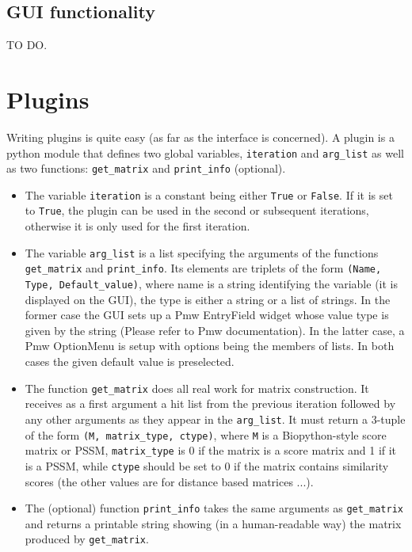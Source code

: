 \documentclass[11pt]{article}
\begin{document}
\subsection{GUI functionality}

TO DO.

\section{Plugins}

Writing plugins is quite easy (as far as the interface is concerned). A plugin is a python module that defines two global variables, \texttt{iteration} and \texttt{arg\_list} as well as two functions: \texttt{get\_matrix} and \texttt{print\_info} (optional).

\begin{itemize}
\item The variable \texttt{iteration} is a constant being either \texttt{True} or \texttt{False}. If it is set to \texttt{True}, the plugin can be used in the second or subsequent iterations, otherwise it is only used for the first iteration.

\item The variable \texttt{arg\_list} is a list specifying the arguments of the functions \texttt{get\_matrix} and \texttt{print\_info}. Its elements are triplets of the form \texttt{(Name, Type, Default\_value)}, where name is a string identifying the variable (it is displayed on the GUI), the type is either a string or a list of strings. In the former case the GUI sets up a Pmw EntryField widget whose value type is given by the string (Please refer to Pmw documentation). In the latter case, a Pmw OptionMenu is setup with options being the members of lists. In both cases the given default value is preselected.

\item The function \texttt{get\_matrix} does all real work for matrix construction. It receives as a first argument a hit list from the previous iteration followed by any other arguments as they appear in the \texttt{arg\_list}. It must return a 3-tuple of the form \texttt{(M, matrix\_type, ctype)}, where \texttt{M} is a Biopython-style score matrix or PSSM, \texttt{matrix\_type} is 0 if the matrix is a score matrix and 1 if it is a PSSM, while \texttt{ctype} should be set to 0 if the matrix contains similarity scores (the other values are for distance based matrices ...).

\item The (optional) function \texttt{print\_info} takes the same arguments as \texttt{get\_matrix} and returns a printable string showing (in a human-readable way) the matrix produced by \texttt{get\_matrix}.

\end{itemize}
\end{document}
